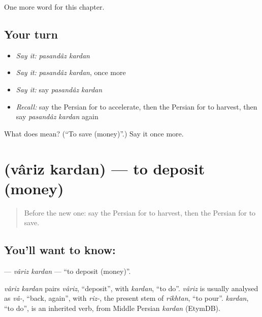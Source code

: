 \begin{grammarlens}[title={What you've built}]
One more word for this chapter.
\end{grammarlens}

\subsection*{Your turn}
\begin{itemize}
\raggedright
  \item \emph{Say it:} \emph{pasandâz kardan}
  \item \emph{Say it:} \emph{pasandâz kardan}, once more
  \item \emph{Say it:} say \emph{pasandâz kardan}
  \item \emph{Recall:} say the Persian for to accelerate, then the Persian for to harvest, then say \emph{pasandâz kardan} again
\end{itemize}

\begin{tcolorbox}[breakable,colback=teal!4,colframe=teal!35!black,title={Before you move on}]
What does    mean? (\textquotedblleft{}To save (money)\textquotedblright{}.) Say it once more.
\end{tcolorbox}
\section[\texorpdfstring{\fa{واریز} \fa{کردن} (vâriz kardan)}{واریز کردن (vâriz kardan)}]{  (vâriz kardan) — to deposit (money)}

\label{lesson:FA-C187-variz-kardan}



\begin{quote}
Before the new one: say the Persian for to harvest, then the Persian for to save.
\end{quote}

\subsection*{You'll want to know:  }
\textbf{ } — \emph{vâriz kardan} — \textquotedblleft{}to deposit (money)\textquotedblright{}.

\begin{cousinweb}
\emph{vâriz kardan} pairs \emph{vâriz}, \textquotedblleft{}deposit\textquotedblright{}, with \emph{kardan}, \textquotedblleft{}to do\textquotedblright{}. \emph{vâriz} is usually analysed as \emph{vâ-}, \textquotedblleft{}back, again\textquotedblright{}, with \emph{riz-}, the present stem of \emph{rikhtan}, \textquotedblleft{}to pour\textquotedblright{}. \emph{kardan}, \textquotedblleft{}to do\textquotedblright{}, is an inherited verb, from Middle Persian \emph{kardan} (EtymDB).
\end{cousinweb}

